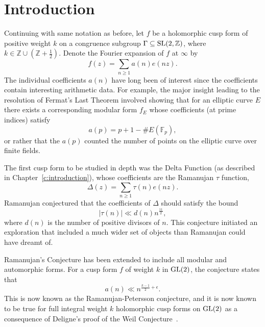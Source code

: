 

\section{Introduction}


Continuing with same notation as before, let $f$ be a holomorphic cusp form of positive
weight $k$ on a congruence subgroup $\Gamma \subseteq \operatorname{SL}(2, \mathbb{Z})$, where $k \in
\mathbb{Z} \cup ( \mathbb{Z} + \tfrac{1}{2})$.
Denote the Fourier expansion of $f$ at $\infty$ by
\begin{equation}
  f(z) = \sum_{n \geq 1} a(n) e(nz).
\end{equation}
The individual coefficients $a(n)$ have long been of interest since the coefficients
contain interesting arithmetic data.
For example, the major insight leading to the resolution of Fermat's Last Theorem involved
showing that for an elliptic curve $E$ there exists a corresponding modular form $f_E$
whose coefficients (at prime indices) satisfy
\begin{equation}
  a(p) = p + 1 - \# E(\mathbb{F}_p),
\end{equation}
or rather that the $a(p)$ counted the number of points on the elliptic curve over finite
fields.


The first cusp form to be studied in depth was the Delta Function (as described in
Chapter~\ref{c:introduction}), whose coefficients are the Ramanujan $\tau$ function,
\begin{equation}
  \Delta(z) = \sum_{n \geq 1} \tau(n) e(nz).
\end{equation}
Ramanujan conjectured that the coefficients of $\Delta$ should satisfy the bound
\begin{equation}
  \lvert \tau(n) \rvert \ll d(n) n^{\frac{11}{2}},
\end{equation}
where $d(n)$ is the number of positive divisors of $n$.
This conjecture initiated an exploration that included a much wider set of objects than
Ramanujan could have dreamt of.



Ramanujan's Conjecture has been extended to include all modular and automorphic forms.
For a cusp form $f$ of weight $k$ in $\operatorname{GL}(2)$, the conjecture states that
\begin{equation}\label{eq:ramanujan_conjecture_an}
  a(n) \ll n^{\frac{k-1}{2} + \epsilon}.
\end{equation}
This is now known as the Ramanujan-Petersson conjecture, and it is now known to be true
for full integral weight $k$ holomorphic cusp forms on $\operatorname{GL}(2)$ as a consequence of
Deligne's proof of the Weil Conjecture~\cite{Deligne}.


